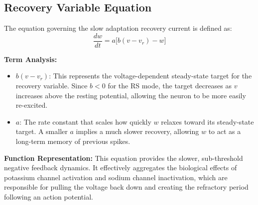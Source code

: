 \documentclass[conference]{IEEEtran}
\begin{document}
\subsection{Recovery Variable Equation}
The equation governing the slow adaptation recovery current is defined as:
\begin{equation}
\frac{dw}{dt} = a \big[ b(v - v_r) - w \big]
\end{equation}

\begin{table}[htbp]
\centering
\caption{Parameters for the Recovery Variable Equation}
\label{tab_rec_params}
\end{table}

\textbf{Term Analysis:}
\begin{itemize}
    \item $b(v - v_r)$: This represents the voltage-dependent steady-state target for the recovery variable. Since $b < 0$ for the RS mode, the target decreases as $v$ increases above the resting potential, allowing the neuron to be more easily re-excited.
    \item $a$: The rate constant that scales how quickly $w$ relaxes toward its steady-state target. A smaller $a$ implies a much slower recovery, allowing $w$ to act as a long-term memory of previous spikes.
\end{itemize}

\textbf{Function Representation:} This equation provides the slower, sub-threshold negative feedback dynamics. It effectively aggregates the biological effects of potassium channel activation and sodium channel inactivation, which are responsible for pulling the voltage back down and creating the refractory period following an action potential.
\end{document}
